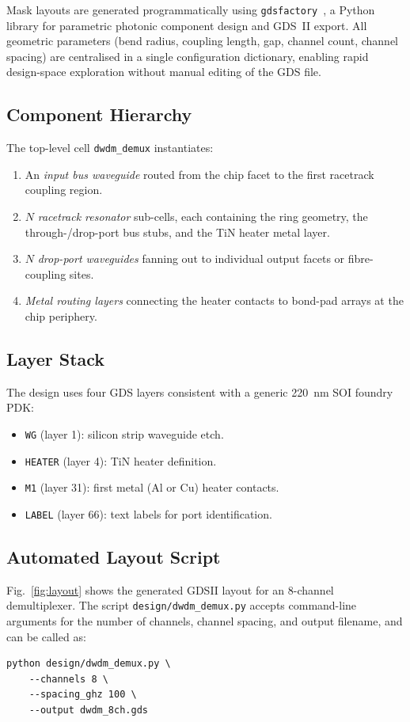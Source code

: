 Mask layouts are generated programmatically using
\texttt{gdsfactory}~\cite{gdsfactory}, a Python library for parametric
photonic component design and GDS~II export.  All geometric parameters
(bend radius, coupling length, gap, channel count, channel spacing) are
centralised in a single configuration dictionary, enabling rapid design-space
exploration without manual editing of the GDS file.

\subsection{Component Hierarchy}
The top-level cell \texttt{dwdm\_demux} instantiates:
\begin{enumerate}
  \item An \emph{input bus waveguide} routed from the chip facet to the
        first racetrack coupling region.
  \item $N$ \emph{racetrack resonator} sub-cells, each containing the
        ring geometry, the through-/drop-port bus stubs, and the TiN
        heater metal layer.
  \item $N$ \emph{drop-port waveguides} fanning out to individual output
        facets or fibre-coupling sites.
  \item \emph{Metal routing layers} connecting the heater contacts to
        bond-pad arrays at the chip periphery.
\end{enumerate}

\subsection{Layer Stack}
The design uses four GDS layers consistent with a generic \SI{220}{\nano\meter}
SOI foundry PDK:
\begin{itemize}
  \item \texttt{WG} (layer 1): silicon strip waveguide etch.
  \item \texttt{HEATER} (layer 4): TiN heater definition.
  \item \texttt{M1} (layer 31): first metal (Al or Cu) heater contacts.
  \item \texttt{LABEL} (layer 66): text labels for port identification.
\end{itemize}

\subsection{Automated Layout Script}
Fig.~\ref{fig:layout} shows the generated GDSII layout for an 8-channel
demultiplexer.  The script \texttt{design/dwdm\_demux.py} accepts command-line
arguments for the number of channels, channel spacing, and output filename,
and can be called as:
\begin{verbatim}
python design/dwdm_demux.py \
    --channels 8 \
    --spacing_ghz 100 \
    --output dwdm_8ch.gds
\end{verbatim}


